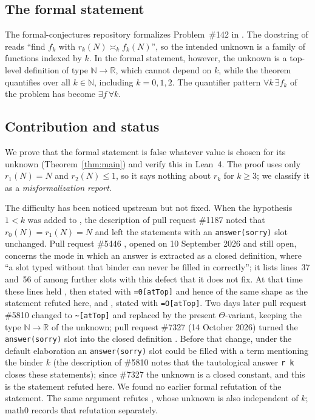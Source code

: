 \documentclass[11pt]{amsart}
\theoremstyle{plain}
\theoremstyle{definition}
\newcommand{\N}{\mathbb{N}}
\newcommand{\R}{\mathbb{R}}
\begin{document}
\subsection*{The formal statement}
The formal-conjectures repository \cite{FC} formalizes Problem~\#142 in .
The docstring of  reads ``find $f_k$ with $r_k(N)\asymp_k f_k(N)$'', so the intended unknown is a family of functions indexed by $k$.
In the formal statement, however, the unknown is a top-level definition  of type $\N\to\R$, which cannot depend on $k$, while the theorem quantifies over all $k\in\N$, including $k=0,1,2$.
The quantifier pattern $\forall k\,\exists f_k$ of the problem has become $\exists f\,\forall k$.

\subsection*{Contribution and status}
We prove that the formal statement is false whatever value is chosen for its unknown (Theorem~\ref{thm:main}) and verify this in Lean~4.
The proof uses only $r_1(N)=N$ and $r_2(N)\le1$, so it says nothing about $r_k$ for $k\ge3$; we classify it as a \emph{misformalization report}.

The difficulty has been noticed upstream but not fixed.
When the hypothesis $1<k$ was added to , the description of pull request \#1187 \cite{PR1187} noted that $r_0(N)=r_1(N)=N$ and left the statements with an \texttt{answer(sorry)} slot unchanged.
Pull request \#5446 \cite{PR5446}, opened on 10 September 2026 and still open, concerns the mode in which an answer is extracted as a closed definition, where ``a slot typed without that binder can never be filled in correctly''; it lists lines~37 and~56 of  among further slots with this defect that it does not fix.
At that time these lines held , then stated with \texttt{=Θ[atTop]} and hence of the same shape as the statement refuted here, and , stated with \texttt{=O[atTop]}.
Two days later pull request \#5810 \cite{PR5810} changed  to \texttt{\textasciitilde[atTop]} and replaced  by the present $\Theta$-variant, keeping the type $\N\to\R$ of the unknown; pull request \#7327 \cite{PR7327} (14 October 2026) turned the \texttt{answer(sorry)} slot into the closed definition .
Before that change, under the default elaboration an \texttt{answer(sorry)} slot could be filled with a term mentioning the binder $k$ (the description of \#5810 notes that the tautological answer \texttt{r k} closes these statements); since \#7327 the unknown is a closed constant, and this is the statement refuted here.
We found no earlier formal refutation of the statement.
The same argument refutes , whose unknown is also independent of $k$; math0 records that refutation separately.
\end{document}
